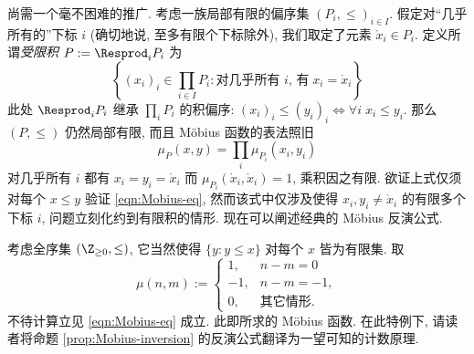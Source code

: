 尚需一个毫不困难的推广. 考虑一族局部有限的偏序集 $(P_i, \leq)_{i \in I}$. 假定对``几乎所有的''下标 $i$ (确切地说, 至多有限个下标除外), 我们取定了元素 $\mathring{x}_i \in P_i$. 定义所谓\emph{受限积} $P := \Resprod_i P_i$ 为
\[ \left\{ (x_i)_i \in \prod_{i \in I} P_i : \text{对几乎所有 $i$, 有}\; x_i = \mathring{x}_i  \right\} \]
此处 $\Resprod_i P_i$ 继承 $\prod_i P_i$ 的积偏序: $(x_i)_i \leq (y_i)_i \iff \forall i\; x_i \leq y_i$. 那么 $(P, \leq)$ 仍然局部有限, 而且 Möbius 函数的表法照旧
\[ \mu_P\left( x, y \right) = \prod_i \mu_{P_i}(x_i, y_i) \]
对几乎所有 $i$ 都有 $x_i = y_i = \mathring{x}_i$ 而 $\mu_{P_i}(\mathring{x}_i, \mathring{x}_i)=1$, 乘积因之有限. 欲证上式仅须对每个 $x \leq y$ 验证 \eqref{eqn:Mobius-eq}, 然而该式中仅涉及使得 $x_i, y_i \neq \mathring{x}_i$ 的有限多个下标 $i$, 问题立刻化约到有限积的情形. 现在可以阐述经典的 Möbius 反演公式.

\begin{example}
	考虑全序集 $(\Z_{\geq 0}, \leq)$, 它当然使得 $\{y: y \leq x\}$ 对每个 $x$ 皆为有限集. 取
	\[ \mu(n,m) := \begin{cases} 1, & n-m = 0 \\ -1, & n-m = -1, \\ 0, & \text{其它情形}. \end{cases} \]
	不待计算立见 \eqref{eqn:Mobius-eq} 成立. 此即所求的 Möbius 函数. 在此特例下, 请读者将命题 \ref{prop:Mobius-inversion} 的反演公式翻译为一望可知的计数原理.
\end{example}


